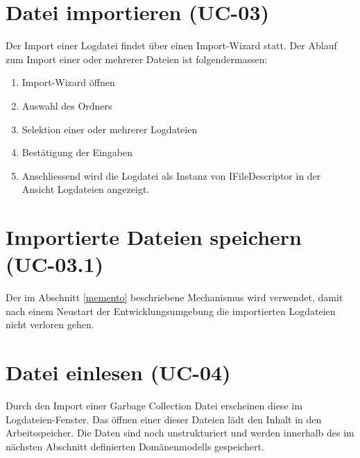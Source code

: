 \section{Datei importieren (UC-03)}
Der Import einer Logdatei findet über einen Import-Wizard statt. Der Ablauf zum Import einer oder mehrerer Dateien ist folgendermassen:
\begin{enumerate}
	\item Import-Wizard öffnen
	\item Auswahl des Ordners
	\item Selektion einer oder mehrerer Logdateien
	\item Bestätigung der Eingaben
	\item Anschliessend wird die Logdatei als Instanz von IFileDescriptor in der Ansicht Logdateien angezeigt.
\end{enumerate}

\section{Importierte Dateien speichern (UC-03.1)}
Der im Abschnitt \ref{memento} beschriebene Mechanismus wird verwendet, damit nach einem Neustart der Entwicklungsumgebung die importierten Logdateien nicht verloren gehen. 

\section{Datei einlesen (UC-04)}
Durch den Import einer Garbage Collection Datei erscheinen diese im Logdateien-Fenster. Das öffnen einer dieser Dateien lädt den Inhalt in den Arbeitsspeicher. Die Daten sind noch unstrukturiert und werden innerhalb des im nächsten Abschnitt definierten Domänenmodells gespeichert.

